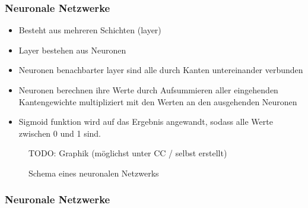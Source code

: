 \begin{frame}
    \frametitle{Neuronale Netzwerke}
    \begin{itemize}
        \item Besteht aus mehreren Schichten (layer)
        \item Layer bestehen aus Neuronen
        \item Neuronen benachbarter layer sind alle durch Kanten untereinander verbunden
        \item Neuronen berechnen ihre Werte durch Aufsummieren aller eingehenden Kantengewichte multipliziert mit den Werten an den ausgehenden Neuronen
        \item Sigmoid funktion wird auf das Ergebnis angewandt, sodass alle Werte zwischen 0 und 1 sind.
    \end{itemize}
    \begin{figure}
        TODO: Graphik (möglichst unter CC / selbst erstellt)
        \caption{Schema eines neuronalen Netzwerks}
    \end{figure}
\end{frame}

\begin{frame}
    \frametitle{Neuronale Netzwerke}
    \begin{figure}
        \centering
        
        \label{fig:nnet}
    \end{figure}
\end{frame}

